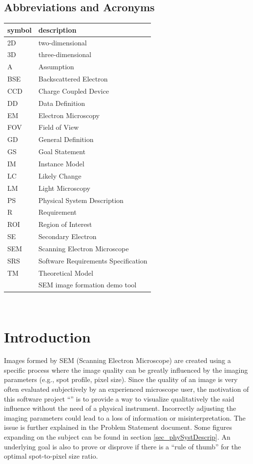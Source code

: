 \documentclass[12pt]{article}
\begin{document}
\subsection{Abbreviations and Acronyms}

\renewcommand{\arraystretch}{1.2}
\begin{tabular}{l l} 
  \toprule		
  \textbf{symbol} & \textbf{description}\\
  \midrule 
  2D & two-dimensional\\
  3D & three-dimensional\\
  A & Assumption\\
  BSE & Backscattered Electron\\
  CCD & Charge Coupled Device\\
  DD & Data Definition\\
  EM & Electron Microscopy\\
  FOV & Field of View\\
  GD & General Definition\\
  GS & Goal Statement\\
  IM & Instance Model\\
  LC & Likely Change\\
  LM & Light Microscopy\\
  PS & Physical System Description\\
  R & Requirement\\
  ROI & Region of Interest\\
  SE & Secondary Electron\\
  SEM & Scanning Electron Microscope\\
  SRS & Software Requirements Specification\\
  TM & Theoretical Model\\
  \progname{} & SEM image formation demo tool\\
  \bottomrule
\end{tabular}\\

\newpage


\section{Introduction}

Images formed by SEM (Scanning Electron Microscope) are created using a 
specific process where the image quality can be greatly influenced by the 
imaging parameters (e.g., spot profile, pixel size). Since the quality of 
an image is very often evaluated subjectively by an experienced microscope 
user, the motivation of this software project ``\progname{}'' is to provide a way to visualize 
qualitatively the said influence without the need of a physical instrument.
Incorrectly adjusting the imaging parameters could lead to a loss of information 
or misinterpretation. The issue is further explained in the 
Problem Statement document. Some figures expanding on the subject can be
found in section \ref{sec_phySystDescrip}.
An underlying goal is also to prove or disprove if 
there is a ``rule of thumb'' for the optimal spot-to-pixel size ratio.
\end{document}
